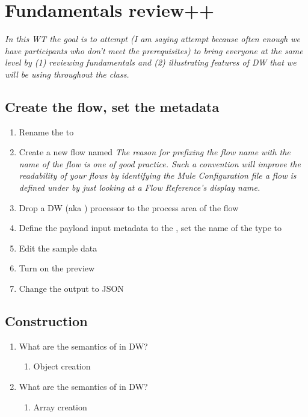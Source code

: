 \section{Fundamentals review++}
\emph{
  In this WT the goal is to attempt (I am saying attempt because often enough we have participants who don’t meet the prerequisites) to bring everyone at the same level by (1) reviewing fundamentals and (2) illustrating features of DW that we will be using throughout the class.
}

\subsection{Create the flow, set the metadata}
\begin{enumerate}
\item Rename the  to 
\item Create a new flow named 
  \newline
  \emph{
    The reason for prefixing the flow name with the name of the flow is one of good practice.
    Such a convention will improve the readability of your flows by identifying the
    Mule Configuration file a flow is defined under by just looking at a Flow Reference's
    display name.
  }
\item Drop a DW (aka ) processor to the process area of the flow
\item Define the payload input metadata to the ,
  set the name of the type to 
\item Edit the sample data
\item Turn on the preview
\item Change the output to JSON
\end{enumerate}

\subsection{Construction}
\begin{enumerate}[resume*]
\item What are the semantics of \ttt{\{\}} in DW?
  \begin{enumerate}
  \item Object creation
  \end{enumerate}
\item What are the semantics of \ttt{[]} in DW?
  \begin{enumerate}
  \item Array creation
  \end{enumerate}
\end{enumerate}

